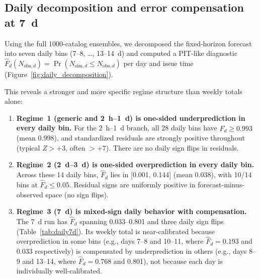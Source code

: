 \documentclass[12pt,letterpaper]{article}
\begin{document}
\subsection{Daily decomposition and error compensation at 7~d}
\label{sec:daily_comp}

Using the full 1000-catalog ensembles, we decomposed the fixed-horizon
forecast into seven daily bins (7--8, \ldots, 13--14~d) and computed a PIT-like
diagnostic $\hat{F}_d(N_{\mathrm{obs},d})=\Pr(N_{\mathrm{sim},d}\leq
N_{\mathrm{obs},d})$ per day and issue time
(Figure~\ref{fig:daily_decomposition}).

This reveals a stronger and more specific regime structure than weekly totals
alone:
\begin{enumerate}
    \item \textbf{Regime~1 (generic and 2~h--1~d) is one-sided underprediction
    in every daily bin.} For the 2~h--1~d branch, all 28 daily bins have
    $\hat{F}_d \ge 0.993$ (mean 0.998), and standardized residuals are strongly
    positive throughout (typical $Z>+3$, often $>+7$). There are no daily sign
    flips in residuals.

    \item \textbf{Regime~2 (2~d--3~d) is one-sided overprediction in every daily
    bin.} Across these 14 daily bins, $\hat{F}_d$ lies in [0.001, 0.144]
    (mean 0.038), with 10/14 bins at $\hat{F}_d \le 0.05$. Residual signs are
    uniformly positive in forecast-minus-observed space (no sign flips).

    \item \textbf{Regime~3 (7~d) is mixed-sign daily behavior with compensation.}
    The 7~d run has $\hat{F}_d$ spanning 0.033--0.801 and three daily sign
    flips (Table~\ref{tab:daily7d}). Its weekly total is near-calibrated because
    overprediction in some bins (e.g., days 7--8 and 10--11, where $\hat{F}_d=0.193$
    and 0.033 respectively) is compensated by underprediction in others
    (e.g., days 8--9 and 13--14, where $\hat{F}_d=0.768$ and 0.801), not because
    each day is individually well-calibrated.
\end{enumerate}
\end{document}
